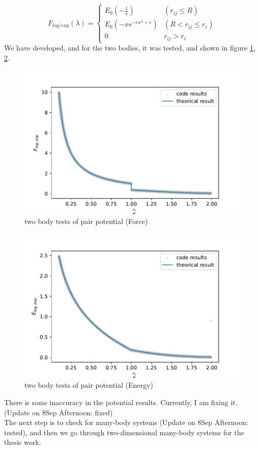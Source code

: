 \documentclass{article}
\begin{document}
\begin{equation}
    	F_{log/exp}(\lambda) =      
	\begin{cases}
		E_0 (-\frac{1}{x})
  & (r_{ij}\leq R)
  \\
		E_0 (-x e^{-ex^2 + e})
  & (R<r_{ij}\leq r_c)
  \\ 0 
  &
  r_{ij} > r_c
	\end{cases}
\end{equation}
We have developed, and for the two bodies, it was tested, and shown in figure \ref{fig:test:1}, \ref{fig:test:2}.
\begin{figure}
    \centering
    \includegraphics{test_2_body.pdf}
    \caption{two body tests of pair potential (Force)}
    \label{fig:test:1}
\end{figure}
\begin{figure}
    \centering
    \includegraphics{test_2_body_energy.pdf}
    \caption{two body tests of pair potential (Energy)}
    \label{fig:test:2}
\end{figure}
There is some inaccuracy in the potential results. Currently, I am fixing it. (Update on 8Sep Afternoon: fixed)
\\
The next step is to check for many-body systems (Update on 8Sep Afternoon: tested), and then we go through two-dimensional many-body systems for the thesis work.
\end{document}
